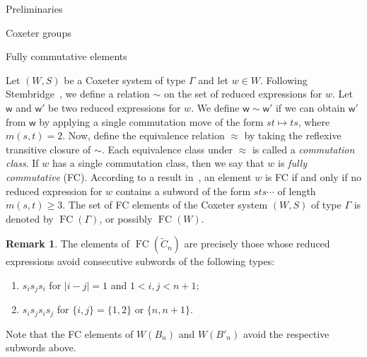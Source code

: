 \documentclass[11pt]{amsart}
\theoremstyle{definition}
\newtheorem{remark}[theorem]{Remark}
\numberwithin{equation}{section}
\newcommand{\C}{\widetilde{C}}
\renewcommand{\(}{\left(}
\renewcommand{\)}{\right)}
\newcommand{\w}{\mathsf{w}}
\DeclareMathOperator{\FC}{FC}
\begin{document}
\begin{section}{Preliminaries}
\begin{subsection}{Coxeter groups}

\end{subsection}


\begin{subsection}{Fully commutative elements}\label{subsec:FC}

Let $(W,S)$ be a Coxeter system of type $\Gamma$ and let $w \in W$. Following Stembridge~\cite{Stembridge1996}, we define a relation $\sim$ on the set of reduced expressions for $w$.  Let $\w$ and $\w'$ be two reduced expressions for $w$.  We define $\w \sim \w'$ if we can obtain $\w'$ from $\w$ by applying a single commutation move of the form $st \mapsto ts$, where $m(s,t)=2$.  Now, define the equivalence relation $\approx$ by taking the reflexive transitive closure of $\sim$.  Each equivalence class under $\approx$ is called a \emph{commutation class}. If $w$ has a single commutation class, then we say that $w$ is \emph{fully commutative} (FC).  According to a result in~\cite{Stembridge1996}, an element $w$ is FC if and only if no reduced expression for $w$ contains a subword of the form $sts \cdots$ of length $m(s,t) \geq 3$.  The set of FC elements of the Coxeter system $(W,S)$ of type $\Gamma$ is denoted by $\FC(\Gamma)$, or possibly $\FC(W)$.

\begin{remark}\label{rem:illegal convex chains}
The elements of $\FC(\C_{n})$ are precisely those whose reduced expressions avoid consecutive subwords of the following types:
\begin{enumerate}
\item $s_{i}s_{j}s_{i}$ for $|i-j|=1$ and $1< i,j < n+1$;
\item $s_{i}s_{j}s_{i}s_{j}$ for $\{i,j\}=\{1,2\}$ or $\{n,n+1\}$.
\end{enumerate}
Note that the FC elements of $W(B_{n})$ and $W(B'_{n})$ avoid the respective subwords above.
\end{remark}


\end{subsection}
\end{section}
\end{document}
